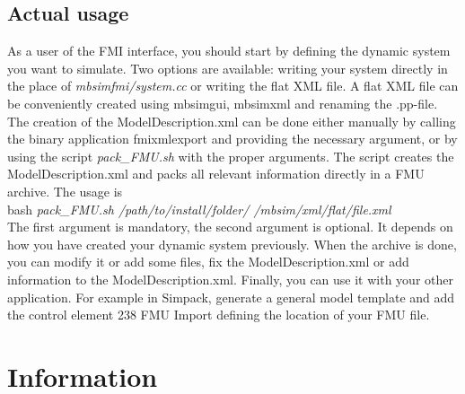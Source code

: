 \documentclass[10pt,a4paper]{report}
\begin{document}
\section{Actual usage}
As a user of the FMI interface, you should start by defining the dynamic system you want to simulate. Two options are available: writing your system directly in the place of \emph{mbsimfmi/system.cc} or writing the flat XML file. A flat XML file can be conveniently created using mbsimgui, mbsimxml and renaming the .pp-file.\\
The creation of the ModelDescription.xml can be done either manually by calling the binary application fmixmlexport and providing the necessary argument, or by using the script \emph{pack\_FMU.sh} with the proper arguments. The script creates the ModelDescription.xml and packs all relevant information directly in a FMU archive. The usage is \\ 
bash \emph{pack\_FMU.sh /path/to/install/folder/ /mbsim/xml/flat/file.xml} \\
The first argument is mandatory, the second argument is optional. It depends on how you have created your dynamic system previously. When the archive is done, you can modify it or add some files, fix the ModelDescription.xml or add information to the ModelDescription.xml. Finally, you can use it with your other application. For example in Simpack, generate a general model template and add the control element 238 FMU Import defining the location of your FMU file.
%
\chapter{Information}
%
\end{document}
